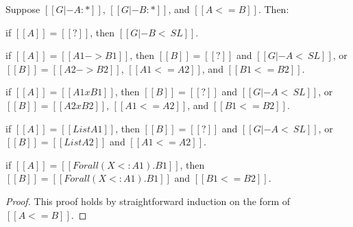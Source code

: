 \begin{lemma}
  \label{lemma:inversion_of_type_precision}
  Suppose $[[G |- A : *]]$, $[[G |- B : *]]$, and $[[A <= B]]$.  Then:
  \begin{enumR}
  \item if $[[A]] = [[?]]$, then $[[G |- B <~ SL]]$.
  \item if $[[A]] = [[A1 -> B1]]$, then
    $[[B]] = [[?]]$ and $[[G |- A <~ SL]]$, or $[[B]] = [[A2 -> B2]]$, $[[A1 <= A2]]$, and $[[B1 <= B2]]$.
  \item if $[[A]] = [[A1 x B1]]$, then
    $[[B]] = [[?]]$ and $[[G |- A <~ SL]]$, or $[[B]] = [[A2 x B2]]$, $[[A1 <= A2]]$, and $[[B1 <= B2]]$.
  \item if $[[A]] = [[List A1]]$, then
    $[[B]] = [[?]]$ and $[[G |- A <~ SL]]$, or $[[B]] = [[List A2]]$ and $[[A1 <= A2]]$.
  \item if $[[A]] = [[Forall (X <: A1).B1]]$, then
    $[[B]] = [[Forall (X <: A1).B1]]$ and $[[B1 <= B2]]$.
  \end{enumR}
\end{lemma}
\begin{proof}
  This proof holds by straightforward induction on the form of $[[A <= B]]$.
\end{proof}

